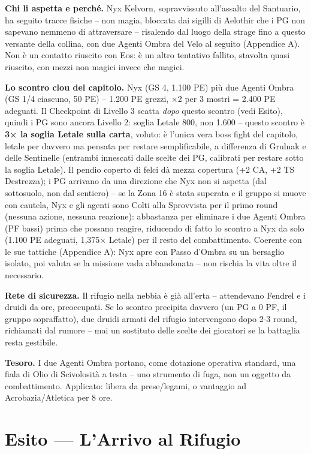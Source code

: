 \textbf{Chi li aspetta e perché.} Nyx Kelvorn, sopravvissuto all'assalto del Santuario, ha seguito tracce fisiche -- non magia, bloccata dai sigilli di Aelothir che i PG non sapevano nemmeno di attraversare -- risalendo dal luogo della strage fino a questo versante della collina, con due Agenti Ombra del Velo al seguito (Appendice A). Non è un contatto riuscito con Eos: è un altro tentativo fallito, stavolta quasi riuscito, con mezzi non magici invece che magici.

\textbf{Lo scontro clou del capitolo.} Nyx (GS 4, 1.100 PE) più due Agenti Ombra (GS 1/4 ciascuno, 50 PE) -- 1.200 PE grezzi, ×2 per 3 mostri = 2.400 PE adeguati. Il Checkpoint di Livello 3 scatta \textit{dopo} questo scontro (vedi Esito), quindi i PG sono ancora Livello 2: soglia Letale 800, non 1.600 -- questo scontro è \textbf{3× la soglia Letale sulla carta}, voluto: è l'unica vera boss fight del capitolo, letale per davvero ma pensata per restare semplificabile, a differenza di Grulnak e delle Sentinelle (entrambi innescati dalle scelte dei PG, calibrati per restare sotto la soglia Letale). Il pendio coperto di felci dà mezza copertura (+2 CA, +2 TS Destrezza); i PG arrivano da una direzione che Nyx non si aspetta (dal sottosuolo, non dal sentiero) -- se la Zona 16 è stata superata e il gruppo si muove con cautela, Nyx e gli agenti sono Colti alla Sprovvista per il primo round (nessuna azione, nessuna reazione): abbastanza per eliminare i due Agenti Ombra (PF bassi) prima che possano reagire, riducendo di fatto lo scontro a Nyx da solo (1.100 PE adeguati, 1,375× Letale) per il resto del combattimento. Coerente con le sue tattiche (Appendice A): Nyx apre con Passo d'Ombra su un bersaglio isolato, poi valuta se la missione vada abbandonata -- non rischia la vita oltre il necessario.

\textbf{Rete di sicurezza.} Il rifugio nella nebbia è già all'erta -- attendevano Fendrel e i druidi da ore, preoccupati. Se lo scontro precipita davvero (un PG a 0 PF, il gruppo sopraffatto), due druidi armati del rifugio intervengono dopo 2-3 round, richiamati dal rumore -- mai un sostituto delle scelte dei giocatori se la battaglia resta gestibile.

\textbf{Tesoro.} I due Agenti Ombra portano, come dotazione operativa standard, una fiala di Olio di Scivolosità a testa -- uno strumento di fuga, non un oggetto da combattimento. Applicato: libera da prese/legami, o vantaggio ad Acrobazia/Atletica per 8 ore.

\section{Esito --- L'Arrivo al Rifugio}

